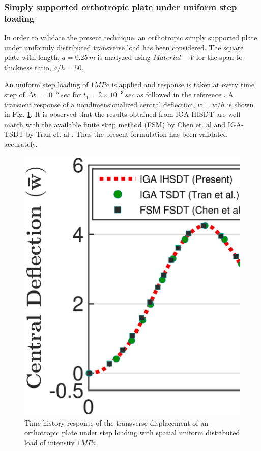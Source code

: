 \documentclass[3p,preprint,12pt]{elsarticle}
\begin{document}
\subsubsection{Simply supported orthotropic plate under uniform step loading}
In order to  validate the present technique, an orthotropic simply supported plate under uniformly distributed transverse load has been considered. The square plate with length, $a=0.25\,m$ is analyzed using $Material-V$ for the span-to-thickness ratio, $a/h=50$.

An uniform step loading of $1 MPa$ is applied and response is taken at every time step of $\Delta t=10^{-5}\,sec$ for $t_{1}=2 \times 10^{-3}\,sec$ as followed in the reference \cite{chen2000nonlinear}. A transient response  of a nondimensionalized central deflection, $\bar{w}=w/h$ is shown in Fig. \ref{fig:TransientOrtho}. It is observed that the results obtained from IGA-IHSDT are well match with the available finite strip method (FSM) by Chen et. al \cite{chen2000nonlinear} and IGA-TSDT by Tran et. al \cite{tran2015geometrically}. Thus the present formulation has been validated accurately.

\begin{figure}
	\graphicspath{{./All_Images/}}
	\centering
	\includegraphics[scale=0.3]{IGA_NPSDT_Transient_h_By_a_1_50.eps}
	\caption{\label{fig:TransientOrtho}Time history response of the transverse displacement of an orthotropic plate under step loading with spatial uniform distributed load of intensity $1 MPa$}
\end{figure}
\end{document}
